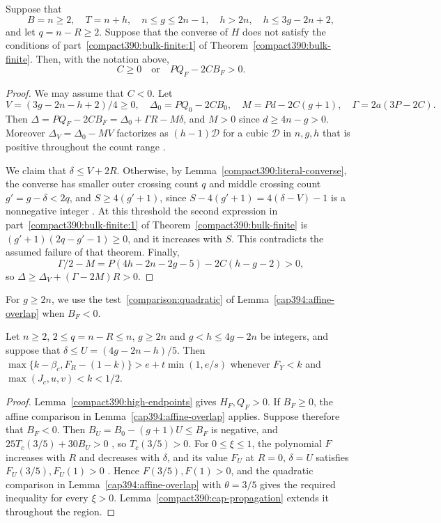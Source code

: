 \begin{lemma}
\label{compact390:middle-overlap}
Suppose that
\[
 B=n\ge2,\quad T=n+h,\quad n\le g\le2n-1,
 \quad h>2n,\quad h\le3g-2n+2,
\]
and let $q=n-R\ge2$.
Suppose that the converse of $H$ does not satisfy the
conditions of part~\ref{compact390:bulk-finite:1} of Theorem~\ref{compact390:bulk-finite}.
Then, with the notation above,
\[
                  C\ge0\quad\text{or}\quad P Q_F-2C B_F>0.
\]
\end{lemma}
\begin{proof}
We may assume that $C<0$. Let
\[
 V=(3g-2n-h+2)/4\ge0,\quad \Delta_0=PQ_0-2CB_0,
 \quad M=Pd-2C(g+1),\quad\Gamma=2a(3P-2C).
\]
Then $\Delta=PQ_F-2CB_F=\Delta_0+\Gamma R-M\delta$, and
$M>0$ since $d\ge4n-g>0$. Moreover $\Delta_V=\Delta_0-MV$ factorizes as
$(h-1)\mathcal D$ for a cubic $\mathcal D$ in $n,g,h$ that is positive throughout
the count range .

We claim that $\delta\le V+2R$. Otherwise, by Lemma~\ref{compact390:literal-converse}, the converse has
smaller outer crossing count $q$ and middle crossing count $g'=g-\delta<2q$,
and $S\ge4(g'+1)$, since $S-4(g'+1)=4(\delta-V)-1$ is a
nonnegative integer . At this threshold the second expression in
part~\ref{compact390:bulk-finite:1} of Theorem~\ref{compact390:bulk-finite}
is $(g'+1)(2q-g'-1)\ge0$, and it increases with $S$.
This contradicts the assumed failure of that theorem.
Finally,
\[
 \Gamma/2-M=P(4h-2n-2g-5)-2C(h-g-2)>0,
\]
so $\Delta\ge\Delta_V+(\Gamma-2M)R>0$.
\end{proof}

For $g\ge2n$, we use the test~\ref{comparison:quadratic} of Lemma~\ref{cap394:affine-overlap} when $B_F<0$.

\begin{lemma}
\label{compact390:high-caps}\label{compact390:large-middle}
Let $n\ge2$, $2\le q=n-R\le n$,
$g\ge2n$ and $g<h\le4g-2n$ be integers, and suppose that
$\delta\le U=(4g-2n-h)/5$.
Then $\max\{k-\beta_c,F_R-(1-k)\}>e+t\min(1,e/s)$ whenever
$F_Y<k$ and $\max(J_c,u,v)<k<1/2$.
\end{lemma}
\begin{proof}
Lemma~\ref{compact390:high-endpoints} gives $H_F,Q_F>0$.
If $B_F\ge0$, the affine comparison in
Lemma~\ref{cap394:affine-overlap} applies. Suppose therefore that $B_F<0$.
Then $B_U=B_0-(g+1)U\le B_F$ is negative, and
$25T_c(3/5)+30B_U>0$ , so $T_c(3/5)>0$.
For $0\le\xi\le1$, the polynomial $F$ increases with $R$ and decreases
with $\delta$, and its value $F_U$ at $R=0$, $\delta=U$ satisfies
$F_U(3/5),F_U(1)>0$ . Hence $F(3/5),F(1)>0$, and the quadratic
comparison in Lemma~\ref{cap394:affine-overlap} with $\theta=3/5$ gives
the required inequality for every $\xi>0$.
Lemma~\ref{compact390:cap-propagation} extends it throughout the region.
\end{proof}

